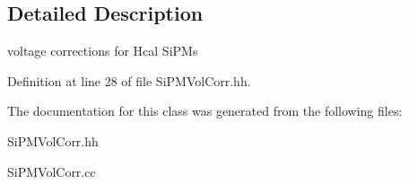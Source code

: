 \subsection{Detailed Description}
voltage corrections for Hcal Si\-P\-Ms 

Definition at line 28 of file Si\-P\-M\-Vol\-Corr.\-hh.



The documentation for this class was generated from the following files\-:\begin{DoxyCompactItemize}
\item 
Si\-P\-M\-Vol\-Corr.\-hh\item 
Si\-P\-M\-Vol\-Corr.\-cc\end{DoxyCompactItemize}
